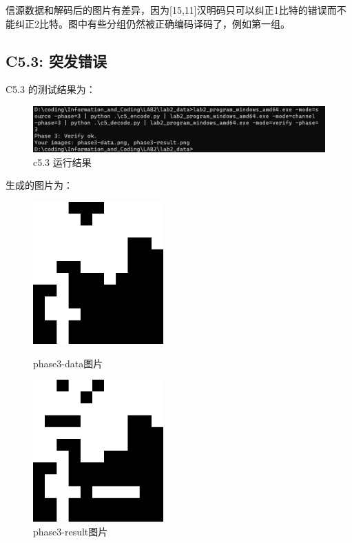 \documentclass[12pt, a4paper]{ctexart}
\begin{document}
    信源数据和解码后的图片有差异，因为[15,11]汉明码只可以纠正1比特的错误而不能纠正2比特。图中有些分组仍然被正确编码译码了，例如第一组。

    \subsection*{C5.3: 突发错误}
    C5.3 的测试结果为：
    \begin{figure}[H]
        \centering
        \includegraphics[width=12cm]{./pic/3-3.png}		
        \caption{c5.3 运行结果}
    \end{figure}

    生成的图片为：
    \begin{figure}[H]
    \centering
    \begin{minipage}[t]{0.45\textwidth}
    \centering
    \includegraphics[width=5cm]{./pic/phase3-data.png}
    \caption{phase3-data图片}
    \end{minipage}
    \hfill
    \begin{minipage}[t]{0.45\textwidth}
    \centering
    \includegraphics[width=5cm]{./pic/phase3-result.png}
    \caption{phase3-result图片}
    \end{minipage}
    \end{figure}
\end{document}
